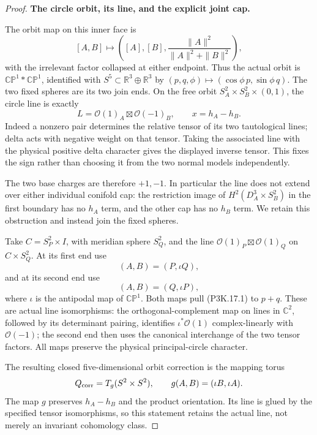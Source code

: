 \begin{proof}
\par\medskip\noindent\textbf{The circle orbit, its line, and the explicit joint cap.}\enspace

The orbit map on this inner face is
\[
 [A,B]\longmapsto
 \left([A],[B],\frac{\|A\|^2}{\|A\|^2+\|B\|^2}\right),
\]
with the irrelevant factor collapsed at either endpoint.
Thus the actual orbit is \(\mathbb {CP}^1*\mathbb {CP}^1\),
identified with \(S^5\subset\mathbb R^3\oplus\mathbb R^3\)
by \((p,q,\phi)\mapsto(\cos\phi\,p,\sin\phi\,q)\).
The two fixed spheres are its two join ends.  On the free orbit
\(S^2_A\times S^2_B\times(0,1)\), the circle line is exactly
\[
           L=\mathcal O(1)_A\boxtimes\mathcal O(-1)_B,
           \qquad x=h_A-h_B.                         \tag{P3K.17.1}
\]
Indeed a nonzero pair determines the relative tensor of its
two tautological lines; delta acts with negative weight on
that tensor.  Taking the associated line with the physical
positive delta character gives the displayed inverse tensor.
This fixes the sign rather than choosing it from the two
normal models independently.

The two base charges are therefore \(+1,-1\).  In particular
the line does not extend over either individual conifold cap:
the restriction image of
\(H^2(D^3_A\times S^2_B)\) in the first boundary has no
\(h_A\) term, and the other cap has no \(h_B\) term.
We retain this obstruction and instead join the fixed spheres.

Take \(C=S^2_P\times I\), with meridian sphere \(S^2_Q\),
and the line \(\mathcal O(1)_P\boxtimes\mathcal O(1)_Q\)
on \(C\times S^2_Q\).  At its first end use
\[
              (A,B)=(P,\iota Q),
\]
and at its second end use
\[
              (A,B)=(Q,\iota P),                    \tag{P3K.17.2}
\]
where \(\iota\) is the antipodal map of \(\mathbb {CP}^1\).
Both maps pull (P3K.17.1) to \(p+q\).  These are actual
line isomorphisms: the orthogonal-complement map on lines in
\(\mathbb C^2\), followed by its determinant pairing,
identifies \(\iota^*\mathcal O(1)\) complex-linearly with
\(\mathcal O(-1)\); the second end then uses the canonical
interchange of the two tensor factors.  All maps preserve
the physical principal-circle character.

The resulting closed five-dimensional orbit correction is the
mapping torus
\[
 Q_{\rm corr}=T_g(S^2\times S^2),\qquad
           g(A,B)=(\iota B,\iota A).
\]
The map \(g\) preserves \(h_A-h_B\) and the product
orientation.  Its line is glued by the specified tensor
isomorphisms, so this statement retains the actual line,
not merely an invariant cohomology class.


\end{proof}
